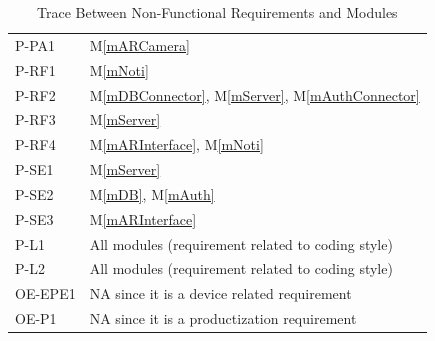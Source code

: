 \documentclass[12pt, titlepage]{article}
\newcommand{\mref}[1]{M\ref{#1}}
\begin{document}
\begin{table}[H]
\begin{tabular}{p{} p{}}
P-PA1 & \mref{mARCamera}\\
P-RF1 & \mref{mNoti}\\
P-RF2 & \mref{mDBConnector}, \mref{mServer}, \mref{mAuthConnector}\\
P-RF3 & \mref{mServer}\\
P-RF4 & \mref{mARInterface}, \mref{mNoti}\\
P-SE1 & \mref{mServer}\\
P-SE2 & \mref{mDB}, \mref{mAuth}\\
P-SE3 & \mref{mARInterface}\\
P-L1 & All modules (requirement related to coding style)\\
P-L2 & All modules (requirement related to coding style)\\
OE-EPE1 & NA since it is a device related requirement\\
OE-P1 & NA since it is a productization requirement\\
\bottomrule
\end{tabular}
\caption{Trace Between Non-Functional Requirements and Modules}
\label{TblNFRT}
\end{table}
\end{document}
